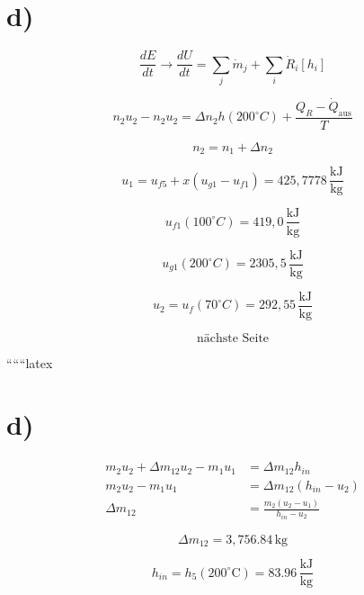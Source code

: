 

\section*{d)}

\[
\frac{dE}{dt} \rightarrow \frac{dU}{dt} = \sum_j \dot{m}_j + \sum_i \dot{R}_i \left[ h_i \right]
\]

\[
n_2 u_2 - n_2 u_2 = \Delta n_2 h (200^\circ C) + \frac{Q_R - \dot{Q}_{\text{aus}}}{T}
\]

\[
n_2 = n_1 + \Delta n_2
\]

\[
u_1 = u_{f5} + x \left( u_{g1} - u_{f1} \right) = 425,7778 \, \frac{\text{kJ}}{\text{kg}}
\]

\[
u_{f1} (100^\circ C) = 419,0 \, \frac{\text{kJ}}{\text{kg}}
\]

\[
u_{g1} (200^\circ C) = 2305,5 \, \frac{\text{kJ}}{\text{kg}}
\]

\[
u_2 = u_f (70^\circ C) = 292,55 \, \frac{\text{kJ}}{\text{kg}}
\]

\[
\text{nächste Seite}
\]

``````latex



\section*{d)}

\begin{align*}
m_2 u_2 + \Delta m_{12} u_2 - m_1 u_1 &= \Delta m_{12} h_{in} \\
m_2 u_2 - m_1 u_1 &= \Delta m_{12} (h_{in} - u_2) \\
\Delta m_{12} &= \frac{m_2 (u_2 - u_1)}{h_{in} - u_2}
\end{align*}

\[
\Delta m_{12} = 3,756.84 \, \text{kg}
\]

\[
h_{in} = h_5 (200^\circ \text{C}) = 83.96 \, \frac{\text{kJ}}{\text{kg}}
\]